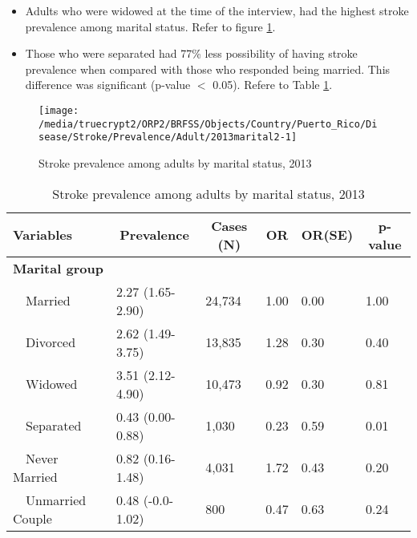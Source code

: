  \newpage
\begin{itemize}

\item Adults who were 
widowed at the time of the interview, had the highest stroke prevalence among marital status. Refer to figure \ref{fig:marital.Stroke.2013}.

\item Those who were separated had 77\% less possibility of having stroke prevalence when compared with those who responded being married. This difference was significant (p-value $<$ 0.05). Refere to Table \ref{tab:marital.Stroke.2013}.

\end{itemize}

\begin{figure}[H]
\caption{Stroke prevalence among adults by marital status,
         2013}
\label{fig:marital.Stroke.2013}
\begin{knitrout}
\color{fgcolor}

{\centering \texttt{[image: /media/truecrypt2/ORP2/BRFSS/Objects/Country/Puerto\_Rico/Disease/Stroke/Prevalence/Adult/2013marital2-1]} 

}



\end{knitrout}
 \end{figure}

\begin{table}[H]
\caption{Stroke prevalence  among adults by marital status, 2013\label{tab:marital.Stroke.2013}} 
\begin{center}
\begin{tabular}{llllll}
\hline\hline
\multicolumn{1}{l}{Variables}&\multicolumn{1}{c}{Prevalence}&\multicolumn{1}{c}{Cases (N)}&\multicolumn{1}{c}{OR}&\multicolumn{1}{c}{OR(SE)}&\multicolumn{1}{c}{p-value}\tabularnewline
\hline
{\bfseries Marital group}&&&&&\tabularnewline
~~Married&2.27 (1.65-2.90)&24,734&1.00&0.00&1.00\tabularnewline
~~Divorced&2.62 (1.49-3.75)&13,835&1.28&0.30&0.40\tabularnewline
~~Widowed&3.51 (2.12-4.90)&10,473&0.92&0.30&0.81\tabularnewline
~~Separated&0.43 (0.00-0.88)& 1,030&0.23&0.59&0.01\tabularnewline
~~Never Married&0.82 (0.16-1.48)& 4,031&1.72&0.43&0.20\tabularnewline
~~Unmarried Couple&0.48 (-0.0-1.02)&   800&0.47&0.63&0.24\tabularnewline
\hline
\end{tabular}\end{center}

\end{table}

